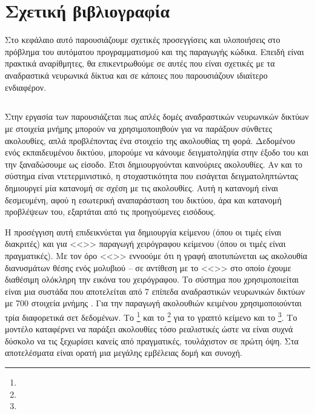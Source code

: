 \chapter{Σχετική βιβλιογραφία}

Στο κεφάλαιο αυτό παρουσιάζουμε σχετικές προσεγγίσεις και υλοποιήσεις στο πρόβλημα του αυτόματου προγραμματισμού και της παραγωγής κώδικα.
Επειδή είναι πρακτικά αναρίθμητες, θα επικεντρωθούμε σε αυτές που είναι σχετικές με τα αναδραστικά νευρωνικά δίκτυα και σε κάποιες που παρουσιάζουν ιδιαίτερο ενδιαφέρον.

\section{}
Στην εργασία των  \cite{Graves2013} παρουσιάζεται πως απλές δομές αναδραστικών νευρωνικών δικτύων με στοιχεία μνήμης  μπορούν να χρησιμοποιηθούν για να παράξουν σύνθετες ακολουθίες, απλά προβλέποντας ένα στοιχείο της ακολουθίας τη φορά. 
Δεδομένου ενός εκπαιδευμένου δικτύου, μπορούμε να κάνουμε δειγματοληψία στην έξοδο του και την ξαναδώσουμε ως είσοδο.
Έτσι δημιουργούνται καινούριες ακολουθίες.
Αν και το σύστημα είναι ντετερμινιστικό, η στοχαστικότητα που εισάγεται δειγματοληπτώντας δημιουργεί μία κατανομή σε σχέση με τις ακολουθίες.
Αυτή η κατανομή είναι δεσμευμένη, αφού η εσωτερική αναπαράσταση του δικτύου, άρα και κατανομή προβλέψεων του, εξαρτάται από τις προηγούμενες εισόδους.

Η προσέγγιση αυτή επιδεικνύεται για δημιουργία κείμενου (όπου οι τιμές είναι διακριτές) και για <<>>  παραγωγή χειρόγραφου κείμενου (όπου οι τιμές είναι πραγματικές).
Με τον όρο <<>> εννοούμε ότι η γραφή αποτυπώνεται ως ακολουθία διανυσμάτων θέσης ενός μολυβιού -- σε αντίθεση με το <<>> στο οποίο έχουμε διαθέσιμη ολόκληρη την εικόνα του χειρόγραφου.
Το σύστημα που χρησιμοποιείται είναι μια συστάδα που αποτελείται από 7 επίπεδα αναδραστικών νευρωνικών δικτύων με 700 στοιχεία μνήμης .
Για την παραγωγή ακολουθιών κειμένου χρησιμοποιούνται τρία διαφορετικά σετ δεδομένων. Το \footnote{} και το \footnote{} για το γραπτό κείμενο και το \footnote{}.
Το μοντέλο καταφέρνει να παράξει ακολουθίες τόσο ρεαλιστικές ώστε να είναι συχνά δύσκολο να τις ξεχωρίσει κανείς από πραγματικές, τουλάχιστον σε πρώτη όψη.
Στα αποτελέσματα είναι ορατή μια μεγάλης εμβέλειας δομή και συνοχή.

